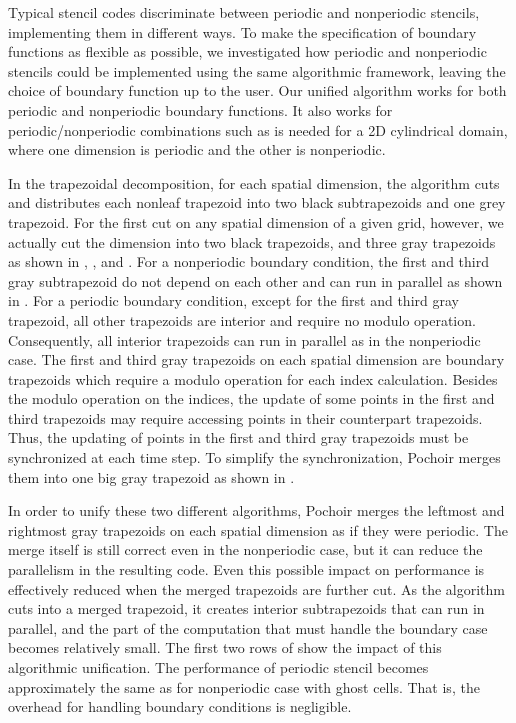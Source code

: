
Typical stencil codes discriminate between periodic and nonperiodic
stencils, implementing them in different ways.  To make the
specification of boundary functions as flexible as possible, we
investigated how periodic and nonperiodic stencils could be
implemented using the same algorithmic framework, leaving the choice
of boundary function up to the user.  Our unified algorithm works for
both periodic and nonperiodic boundary functions.  It also works for
periodic/nonperiodic combinations such as is needed for a 2D
cylindrical domain, where one dimension is periodic and the other is
nonperiodic.

In the trapezoidal decomposition, for each spatial dimension, the
 algorithm cuts and distributes each nonleaf trapezoid into
two black subtrapezoids and one grey trapezoid.  For the first cut on
any spatial dimension of a given grid, however, we actually cut the
dimension into two black trapezoids, and three gray trapezoids as
shown in , , and .  For a
nonperiodic boundary condition, the first and third gray subtrapezoid
do not depend on each other and can run in parallel as shown in
.  For a periodic boundary condition, except for the
first and third gray trapezoid, all other trapezoids are interior and
require no modulo operation.  Consequently, all interior trapezoids
can run in parallel as in the nonperiodic case.  The first and third
gray trapezoids on each spatial dimension are boundary trapezoids
which require a modulo operation for each index calculation.  Besides
the modulo operation on the indices, the update of some points in the
first and third trapezoids may require accessing points in their
counterpart trapezoids.  Thus, the updating of points in the first and
third gray trapezoids must be synchronized at each time step.  To
simplify the synchronization, Pochoir merges them into one big gray
trapezoid as shown in .

In order to unify these two different algorithms, Pochoir merges the
leftmost and rightmost gray trapezoids on each spatial dimension as if
they were periodic.  The merge itself is still correct even in the
nonperiodic case, but it can reduce the parallelism in the resulting
code.  Even this possible impact on performance is effectively reduced
when the merged trapezoids are further cut.  As the algorithm cuts
into a merged trapezoid, it creates interior subtrapezoids that can
run in parallel, and the part of the computation that must handle the
boundary case becomes relatively small.  The first two rows of
 show the impact of this algorithmic unification.
The performance of periodic stencil becomes approximately the same as
for nonperiodic case with ghost cells.  That is, the overhead for
handling boundary conditions is negligible.

